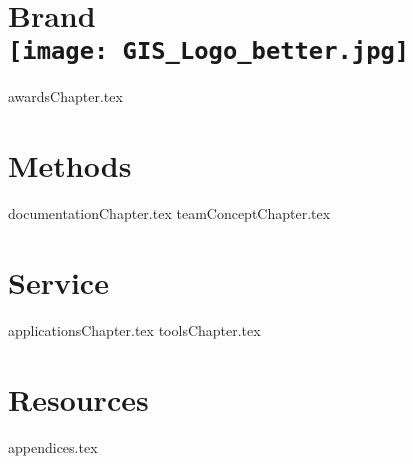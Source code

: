 \documentclass[twoside]{memoir}  %
\title{}  %
\begin{document}
%
%
\pagestyle{empty} %
%
\frontmatter %
%
\maketitle %
\clearpage
\tableofcontents %
%
\restoregeometry %
%
\mainmatter %
%
\pagestyle{fancy} %
%

\part[Brand]{Brand\\{\texttt{[image: GIS\_Logo\_better.jpg]}}}
%

{awardsChapter.tex}
%
\part{Methods}
{documentationChapter.tex}
{teamConceptChapter.tex}
%
\part{Service}
{applicationsChapter.tex}
{toolsChapter.tex}
%
%
\part{Resources}
{appendices.tex}
%
\backmatter %
%
%
%
\glsaddall %
\printglossaries %
%
%
\printindex %
%
\end{document}
